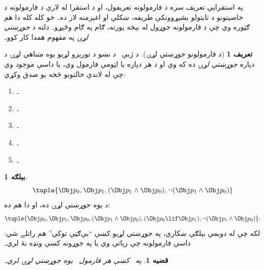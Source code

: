 \documentclass[12pt,a4paper,oneside]{report}
\newcommand{\olfileid}[3]{\gdef\pspart{#1}\gdef\pschapter{#2}\gdef\pssection{#3}}
\gdef\pspart{#2}\gdef\pschapter{#3}\gdef\pssection{}%
\newcommand{\ollabel}[1]{\label{\pspart:\pschapter:\pssection:#1}}
\newtheorem{prop}[thm]{قضيه}
\theoremstyle{definition}
\newtheorem{defn}[thm]{تعريف}
\newtheorem{ex}[thm]{بېلګه}
\begin{document}
\label{olpseg:OLP-0060-B004:start}
\olfileid{pl}{syn}{fseq}
\label{olpseg:OLP-0060-B004:end}

\label{olpseg:OLP-0060-B005:start}
\label{olpseg:OLP-0060-B005:end}

\label{olpseg:OLP-0060-B006:start}
په استقرايي تعريف سره د فارمولونه تعريفول، او د استقرا له لارې
د فارمولونه د خاصيتونو د ثابتولو بشپړوونکې طريقه، ښکلې او اغېزمنه
لار ده۔ خو کله کله دا هم ګټوره وي چې د فارمولونه جوړول له بېخه
پورته، ګام په ګام وڅېړو۔ دلته د \emph{جوړښتي لړۍ} په مفهوم همدا کار
کوو۔
\label{olpseg:OLP-0060-B006:end}

\label{olpseg:OLP-0060-B007:start}
\begin{defn}[د فارمولونو جوړښتي لړۍ]
\ollabel{defn:fseq-frm}
د ژبې~ د نښو د توريزو لړيو يوه متناهي لړۍ
 د  دپاره \emph{جوړښتي لړۍ} ده که
 وي او د هر  دپاره يا  اټومي
فارمول وي، يا داسې  موجود وي چې له لاندې حالتونو څخه يو
صدق وکړي:
\begin{enumerate}
    \item {}۔%
    \item {}۔%
    \item {}۔%
    \item {}۔%
    \item {}۔%
\end{enumerate}
\end{defn}
\label{olpseg:OLP-0060-B007:end}

\label{olpseg:OLP-0060-B008:start}
\begin{ex}
\[
\tuple{
    \Obj p_0,
    \Obj p_1,
    (\Obj p_1 \land \Obj p_0),
    \lnot (\Obj p_1 \land \Obj p_0)
}
\]
د  يوه جوړښتي لړۍ ده، او دا هم ده:
\[
\tuple{
    \Obj p_0,
    \Obj p_1,
    \Obj p_0,
    (\Obj p_1 \land \Obj p_0),
    (\Obj p_0 \lif \Obj p_1),
    \lnot (\Obj p_1 \land \Obj p_0)
}.
\]
%
لکه چې له دويمې بېلګې ښکاري، په جوړښتي لړيو کښې ``بې‌ګټې توکي''
هم راتلے شي: داسې فارمولونه چې زياتي وي يا په جوړونه کښې ونډه نۀ
لري۔
\end{ex}
\label{olpseg:OLP-0060-B008:end}

\label{olpseg:OLP-0060-B009:start}
\begin{prop}
\ollabel{prop:formed}
په~\LR{$\Frm[L_0]$} کښې هر فارمول~ يوه جوړښتي لړۍ لري۔
\end{prop}
\label{olpseg:OLP-0060-B009:end}
\end{document}
